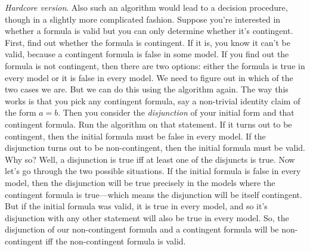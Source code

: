 \begin{itemize}
    \emph{Hardcore version}. Also such an algorithm would lead to a
    decision procedure, though in a slightly more complicated
    fashion. Suppose you're interested in whether a formula is valid
    but you can only determine whether it's contingent. First, find
    out whether the formula is contingent. If it is, you know it can't
    be valid, because a contingent formula is false in some model. If
    you find out the formula is not contingent, then there are
    two options: either the formula is true in every model
    or it is false in every model. We need to figure out in which of
    the two cases we are. But we can do this using the algorithm
    again. The way this works is that you pick any contingent formula,
    say a non-trivial identity claim of the form $a=b$. Then you
    consider the \emph{disjunction} of your initial form and that
    contingent formula. Run the algorithm on that statement. If it
    turns out to be contingent, then the initial formula must be false
    in every model. If the disjunction turns out to be non-contingent,
    then the initial formula must be valid. Why so? Well, a disjunction
    is true iff at least one of the disjuncts is true. Now let's go
    through the two possible situations. If the initial formula is
    false in every model, then the disjunction will be true precisely
    in the models where the contingent formula is true---which means
    the disjunction will be itself contingent. But if the initial
    formula was valid, it is true in every model, and so it's
    disjunction with any other statement will also be true in every
    model. So, the disjunction of our non-contingent formula and a
    contingent formula will be non-contingent iff the non-contingent
    formula is valid.
  
\end{itemize}


